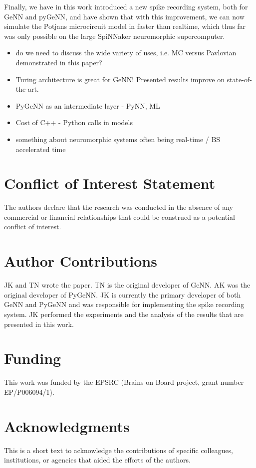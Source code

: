 \documentclass[utf8]{frontiersSCNS} %
\begin{document}
Finally, we have in this work introduced a new spike recording system, both for GeNN and pyGeNN, and have shown that with this improvement, we can now simulate the Potjans microcircuit model in faster than realtime, which thus far was only possible on the large SpiNNaker neuromorphic supercomputer.

\begin{itemize}
  \item do we need to discuss the wide variety of uses, i.e. MC versus Pavlovian demonstrated in this paper?
    \item Turing architecture is great for GeNN! Presented results improve on state-of-the-art.
    \item PyGeNN as an intermediate layer - PyNN, ML
    \item Cost of C++ - Python calls in models
    \item something about neuromorphic systems often being real-time / BS accelerated time
\end{itemize}

\section*{Conflict of Interest Statement}
The authors declare that the research was conducted in the absence of any commercial or financial relationships that could be construed as a potential conflict of interest.

\section*{Author Contributions}
JK and TN wrote the paper.
TN is the original developer of GeNN.
AK was the original developer of PyGeNN.
JK is currently the primary developer of both GeNN and PyGeNN and was responsible for implementing the spike recording system.
JK performed the experiments and the analysis of the results that are presented in this work.

\section*{Funding}
This work was funded by the EPSRC (Brains on Board project, grant number EP/P006094/1).

\section*{Acknowledgments}
This is a short text to acknowledge the contributions of specific colleagues, institutions, or agencies that aided the efforts of the authors.
\end{document}
